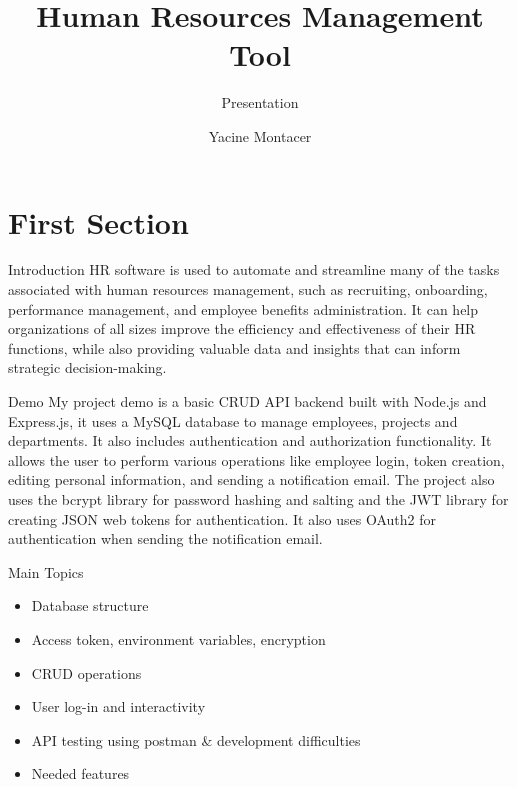 \documentclass[aspectratio=169,xcolor=dvipsnames]{beamer}
\title[short title]{Human Resources Management Tool} %
\subtitle{Presentation}
\author {Yacine Montacer}
\institute[NTU] %
{
	Department of Information Technology \\
	Tunis Business School %
}
\begin{document}
	
	\begin{frame}
		\titlepage
	\end{frame}
	
	\section{First Section}
	
	
	\begin{frame}{Introduction}
		HR software is used to automate and streamline many of the tasks associated with human resources management, such as recruiting, onboarding, performance management, and employee benefits administration. It can help organizations of all sizes improve the efficiency and effectiveness of their HR functions, while also providing valuable data and insights that can inform strategic decision-making. 
	\end{frame}
	
	\begin{frame}{Demo}
		My project demo is a basic CRUD API backend built with Node.js and Express.js, it uses a MySQL database to manage employees, projects and departments. It also includes authentication and authorization functionality. It allows the user to perform various operations like employee login, token creation, editing personal information, and sending a notification email. The project also uses the bcrypt library for password hashing and salting and the JWT library for creating JSON web tokens for authentication. It also uses OAuth2 for authentication when sending the notification email.
	\end{frame}
	
	
	
	\begin{frame}{Main Topics}
		\begin{itemize}
			\item Database structure
			\item Access token, environment variables, encryption
			\item CRUD operations
			\item User log-in and interactivity
			\item API testing using postman & development difficulties
			\item Needed features
		\end{itemize}
	\end{frame}
	
\end{document}
